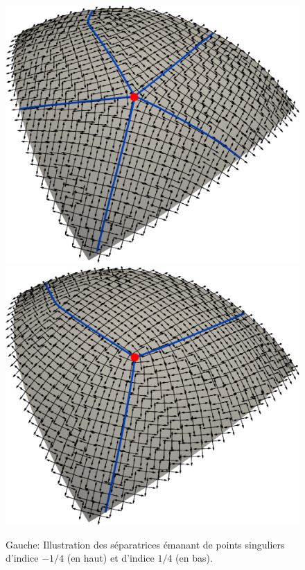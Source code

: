 \begin{figure}[!h]
  \centering
  \includegraphics[scale=0.25]{images/surface_sepa_5.pdf}
\\[0.5cm]
  \includegraphics[scale=0.25]{images/surface_sepa_3.pdf}
  \caption{Gauche: Illustration des séparatrices émanant de points singuliers d'indice $-1/4$ (en haut) et d'indice $1/4$ (en bas).}
  \label{fig:separatrice_illustration_surface}
\end{figure}

